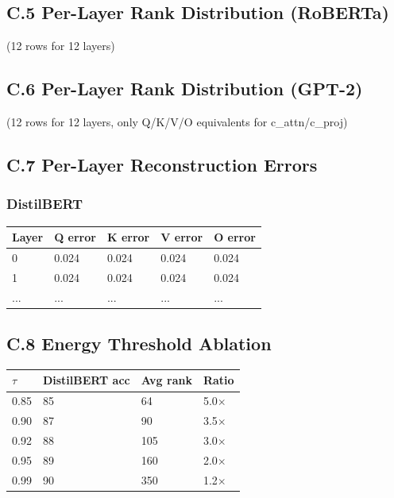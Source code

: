 \subsection{C.5 Per-Layer Rank Distribution (RoBERTa)}

(12 rows for 12 layers)

\subsection{C.6 Per-Layer Rank Distribution (GPT-2)}

(12 rows for 12 layers, only Q/K/V/O equivalents for c\_attn/c\_proj)

\subsection{C.7 Per-Layer Reconstruction Errors}

\subsubsection{DistilBERT}

\begin{table}[H]
\centering
\small
\begin{tabular}{lllll}
\toprule
\textbf{Layer} & \textbf{Q error} & \textbf{K error} & \textbf{V error} & \textbf{O error} \\
\midrule
0 & 0.024 & 0.024 & 0.024 & 0.024 \\
1 & 0.024 & 0.024 & 0.024 & 0.024 \\
... & ... & ... & ... & ... \\
\bottomrule
\end{tabular}
\end{table}

\subsection{C.8 Energy Threshold Ablation}

\begin{table}[H]
\centering
\small
\begin{tabular}{llll}
\toprule
\textbf{$\tau$} & \textbf{DistilBERT acc} & \textbf{Avg rank} & \textbf{Ratio} \\
\midrule
0.85 & 85 & 64 & 5.0$\times$ \\
0.90 & 87 & 90 & 3.5$\times$ \\
0.92 & 88 & 105 & 3.0$\times$ \\
0.95 & 89 & 160 & 2.0$\times$ \\
0.99 & 90 & 350 & 1.2$\times$ \\
\bottomrule
\end{tabular}
\end{table}

